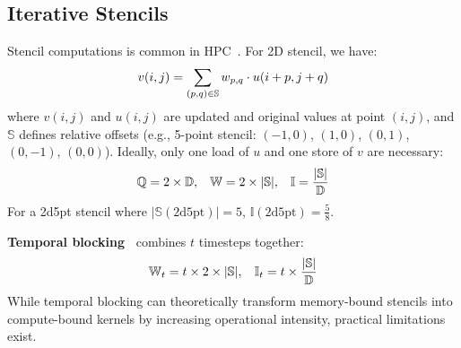








\subsection{Iterative Stencils}\label{sec:theostencil}

Stencil computations is common in HPC~\cite{hagedorn2018high}. For 2D stencil, we have:
\begin{equation}\footnotesize
v(i,j) = \sum_{(p,q) \in \mathbb{S}} w_{p,q} \cdot u(i+p,j+q)
\end{equation}
where $v(i,j)$ and $u(i,j)$ are updated and original values at point $(i,j)$, and $\mathbb{S}$ defines relative offsets (e.g., 5-point stencil: $(-1,0)$, $(1,0)$, $(0,1)$, $(0,-1)$, $(0,0)$).
Ideally, only one load of $u$ and one store of $v$ are necessary:
\begin{equation}\footnotesize
\mathbb{Q}=2\times\mathbb{D}, \quad \mathbb{W}=2\times|\mathbb{S}|, \quad \mathbb{I}=\frac{|\mathbb{S}|}{\mathbb{D}}
\end{equation}
For a 2d5pt stencil where $|\mathbb{S}
(\text{2d5pt})|=5$, $\mathbb{I}(\text{2d5pt})=\tfrac{5}{8}$.

\noindent\textbf{Temporal blocking~\cite{10.1145/3577193.3593716,10.1145/3368826.3377904}} combines $t$ timesteps together:
\begin{equation}\footnotesize
\mathbb{W}_{t}=t\times2\times|\mathbb{S}|, \quad \mathbb{I}_{t}=t\times\frac{|\mathbb{S}|}{\mathbb{D}}
\end{equation}
While temporal blocking can theoretically transform memory-bound stencils into compute-bound kernels by increasing operational intensity, practical limitations exist. 

